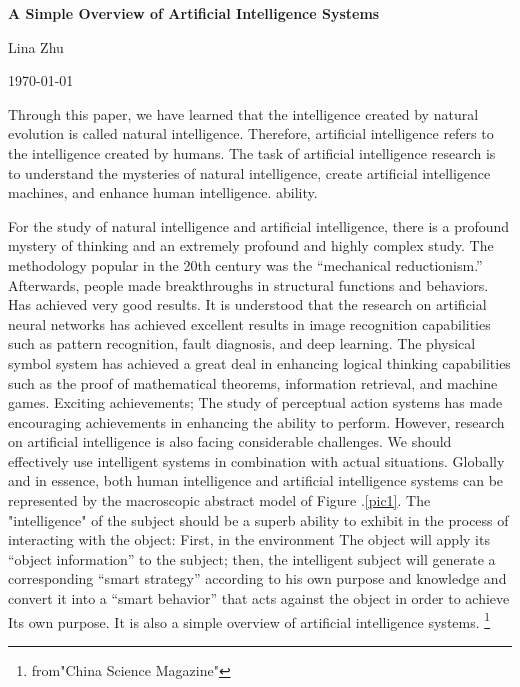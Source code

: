 \documentclass[a4paper,12pt,twocolumn]{article}
\begin{document}
	\begin{center}
		
		{\bfseries \LARGE 	A Simple Overview of Artificial Intelligence Systems} 
	\end{center}
	\begin{center}
		Lina Zhu
	\end{center}
	\begin{center}
		\today
	\end{center}
	\par Through this paper, we have learned that the intelligence created by natural evolution is called natural intelligence. Therefore, artificial intelligence refers to the intelligence created by humans. The task of artificial intelligence research is to understand the mysteries of natural intelligence, create artificial intelligence machines, and enhance human intelligence. ability. 
	
	\par For the study of natural intelligence and artificial intelligence, there is a profound mystery of thinking and an extremely profound and highly complex study. The methodology popular in the 20th century was the “mechanical reductionism.” Afterwards, people made breakthroughs in structural functions and behaviors. Has achieved very good results. It is understood that the research on artificial neural networks has achieved excellent results in image recognition capabilities such as pattern recognition, fault diagnosis, and deep learning. The physical symbol system has achieved a great deal in enhancing logical thinking capabilities such as the proof of mathematical theorems, information retrieval, and machine games. Exciting achievements; The study of perceptual action systems has made encouraging achievements in enhancing the ability to perform. However, research on artificial intelligence is also facing considerable challenges. We should effectively use intelligent systems in combination with actual situations. Globally and in essence, both human intelligence and artificial intelligence systems can be represented by the macroscopic abstract model of Figure .\ref{pic1}. The "intelligence" of the subject should be a superb ability to exhibit in the process of interacting with the object: First, in the environment The object will apply its “object information” to the subject; then, the intelligent subject will generate a corresponding “smart strategy” according to his own purpose and knowledge and convert it into a “smart behavior” that acts against the object in order to achieve Its own purpose. It is also a simple overview of artificial intelligence systems.
\footnote{from"China Science Magazine"} 
\end{document}
